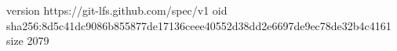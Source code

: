 version https://git-lfs.github.com/spec/v1
oid sha256:8d5c41dc9086b855877de17136ceee40552d38dd2e6697de9ec78de32b4c4161
size 2079
